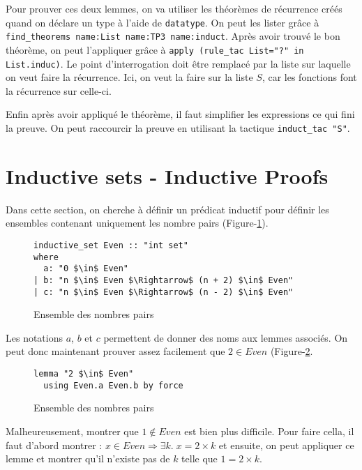 \documentclass{article}
\theoremstyle{plain}
\begin{document}
Pour prouver ces deux lemmes, on va utiliser les théorèmes de récurrence
créés quand on déclare un type à l'aide de \texttt{datatype}. On peut les
lister grâce à \texttt{find\_theorems name:List name:TP3 name:induct}. Après
avoir trouvé le bon théorème, on peut l'appliquer grâce à \texttt{apply
(rule\_tac List="?" in List.induc)}. Le point d'interrogation doit être
remplacé par la liste sur laquelle on veut faire la récurrence. Ici, on veut la
faire sur la liste $S$, car les fonctions font la récurrence sur celle-ci.

Enfin après avoir appliqué le théorème, il faut simplifier les expressions ce
qui fini la preuve. On peut raccourcir la preuve en utilisant la tactique
\texttt{induct\_tac "S"}.

\section{Inductive sets - Inductive Proofs}

Dans cette section, on cherche à définir un prédicat inductif pour définir les
ensembles contenant uniquement les nombre pairs (Figure-\ref{fig:ev}).

    \begin{figure}[thpb]
  \begin{lstlisting}
inductive_set Even :: "int set"
where
  a: "0 $\in$ Even"
| b: "n $\in$ Even $\Rightarrow$ (n + 2) $\in$ Even"
| c: "n $\in$ Even $\Rightarrow$ (n - 2) $\in$ Even"
  \end{lstlisting}
  \caption{Ensemble des nombres pairs}
  \label{fig:ev}
  \end{figure}

  Les notations $a$, $b$ et $c$ permettent de donner des noms aux lemmes
  associés. On peut donc maintenant prouver assez facilement que
  $2 \in \textit{Even}$ (Figure-\ref{fig:2ev}.

  \begin{figure}[thpb]
  \begin{lstlisting}
lemma "2 $\in$ Even"
  using Even.a Even.b by force
  \end{lstlisting}
  \caption{Ensemble des nombres pairs}
  \label{fig:2ev}
  \end{figure}

  Malheureusement, montrer que $1 \not \in \textit{Even}$ est bien plus
  difficile. Pour faire cella, il faut d'abord montrer :
  $x \in \textit{Even} \Rightarrow \exists k.\; x = 2 \times k$ et ensuite, on
  peut appliquer ce lemme et montrer qu'il n'existe pas de $k$ telle que $1 = 2
  \times k$.
\end{document}
